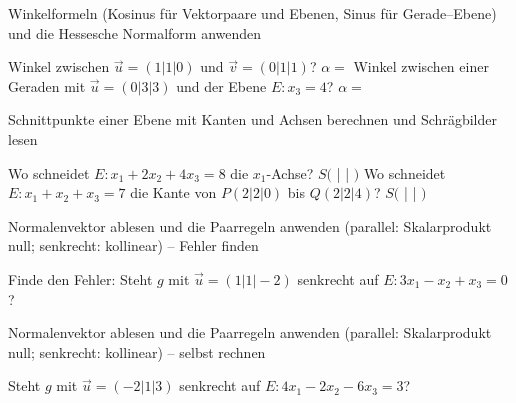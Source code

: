 \begin{aufgabe}{Winkelformeln (Kosinus für Vektorpaare und Ebenen, Sinus für Gerade–Ebene) und die Hessesche Normalform anwenden}
\begin{teile}
\teil Winkel zwischen $\vec{u} = (1 | 1 | 0)$ und $\vec{v} = (0 | 1 | 1)$? $\alpha = $ \leerfeld
\teil Winkel zwischen einer Geraden mit $\vec{u} = (0 | 3 | 3)$ und der Ebene $E: x_3 = 4$? $\alpha = $ \leerfeld
\end{teile}
\end{aufgabe}

\begin{aufgabe}{Schnittpunkte einer Ebene mit Kanten und Achsen berechnen und Schrägbilder lesen}
\begin{teile}
\teil Wo schneidet $E: x_1 + 2x_2 + 4x_3 = 8$ die $x_1$-Achse? $S($ \leerfeld | \leerfeld | \leerfeld $)$
\teil Wo schneidet $E: x_1 + x_2 + x_3 = 7$ die Kante von $P(2 | 2 | 0)$ bis $Q(2 | 2 | 4)$? $S($ \leerfeld | \leerfeld | \leerfeld $)$
\end{teile}
\end{aufgabe}

\begin{aufgabe}{Normalenvektor ablesen und die Paarregeln anwenden (parallel: Skalarprodukt null; senkrecht: kollinear) – Fehler finden}
\begin{teile}
\teil Finde den Fehler: Steht $g$ mit $\vec{u} = (1 | 1 | -2)$ senkrecht auf $E: 3x_1 - x_2 + x_3 = 0$? 
\end{teile}
\end{aufgabe}

\begin{aufgabe}{Normalenvektor ablesen und die Paarregeln anwenden (parallel: Skalarprodukt null; senkrecht: kollinear) – selbst rechnen}
\begin{teile}
\teil Steht $g$ mit $\vec{u} = (-2 | 1 | 3)$ senkrecht auf $E: 4x_1 - 2x_2 - 6x_3 = 3$? \janein
\end{teile}
\end{aufgabe}
